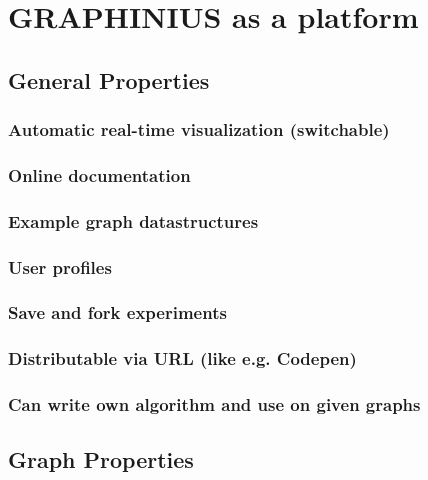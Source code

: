 \chapter{GRAPHINIUS as a platform}
\label{ch:graphinius_platform}


\section{General Properties}
\label{sect:general_properties}
	
	\subsection{Automatic real-time visualization (switchable)}
	\label{ssect:realtime_vis}
	
	\subsection{Online documentation}
	\label{ssect:online_doc}
	
	\subsection{Example graph datastructures}
	\label{ssect:pre_settings}
	
	\subsection{User profiles}
	\label{ssect:user_profiles}
	
	\subsection{Save and fork experiments}
	\label{ssect:save_fork}
	
	\subsection{Distributable via URL (like e.g. Codepen)}
	\label{ssect:distribute_url}
	
	\subsection{Can write own algorithm and use on given graphs}
	\label{ssect:define_algos}



\section{Graph Properties}
\label{sect:graph_properties}

